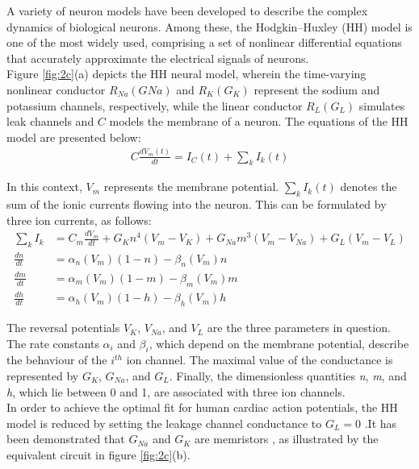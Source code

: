 \noindent A variety of neuron models have been developed to describe the complex dynamics of biological neurons. Among these, the Hodgkin–Huxley (HH) model is one of the most widely used, comprising a set of nonlinear differential equations that accurately approximate the electrical signals of neurons. \\

\noindent Figure \ref{fig:2c}(a) depicts the HH neural model, wherein the time-varying nonlinear conductor $R_{Na}(GNa)$ and $R_K(G_K)$ represent the sodium and potassium channels, respectively, while the linear conductor $R_L(G_L)$ simulates leak channels and $C$ models the membrane of a neuron. The equations of the HH model are presented below: 
\begin{align}
C \frac{dV_m(t)}{dt} = I_C(t) + \sum_{k}^{}I_k(t) \label{eq:2.1} 
\end{align}

\noindent In this context, $V_m$ represents the membrane potential. $\sum_{k}^{}I_k(t)$ denotes the sum of the ionic currents flowing into the neuron. This can be formulated by three ion currents, as follows:
\begin{align}
\sum_{k}^{}I_k &= C_m \frac{dV_m}{dt} + G_Kn^4(V_m - V_K) + G_{Na}m^3(V_m - V_{Na}) + G_L (V_m - V_L) \label{eq:2.2} \\
\frac{dn}{dt} &= \alpha_n(V_m)(1-n)-\beta_n(V_m)n \label{eq:2.3} \\
\frac{dm}{dt} &= \alpha_m(V_m)(1-m) - \beta_m(V_m)m \label{eq:2.4} \\
\frac{dh}{dt} &= \alpha_h(V_m)(1-h)-\beta_h(V_m)h \label{eq:2.5}
\end{align}

\noindent The reversal potentials $V_K$, $V_{Na}$, and $V_L$ are the three parameters in question. The rate constants $\alpha_i$ and $\beta_i$, which depend on the membrane potential, describe the behaviour of the $i^{th}$ ion channel. The maximal value of the conductance is represented by $G_K$, $G_{Na}$, and $G_L$. Finally, the dimensionless quantities \textit{n}, \textit{m}, and \textit{h}, which lie between 0 and 1, are associated with three ion channels. \\

\noindent In order to achieve the optimal fit for human cardiac action potentials, the HH model is reduced by setting the leakage channel conductance to $G_L = 0$  \cite{noble1962modification}.It has been demonstrated that $G_{Na}$ and $G_K$ are memristors \cite{chua1976memristive}, as illustrated by the equivalent circuit in figure \ref{fig:2c}(b). \\


